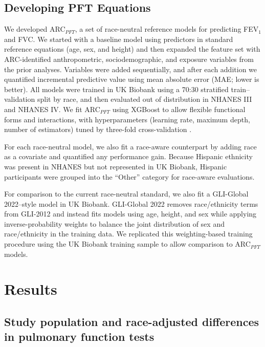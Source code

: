 \documentclass[10pt]{extarticle}
\begin{document}
\subsection{Developing PFT Equations }\label{developing-pft-equations}

We developed ARC$_{PFT}$, a set of race-neutral reference models for predicting FEV$_{1}$ and FVC. We started with a baseline model using predictors in standard reference equations (age, sex, and height) and then expanded the feature set with ARC-identified anthropometric, sociodemographic, and exposure variables from the prior analyses. Variables were added sequentially, and after each addition we quantified incremental predictive value using mean absolute error (MAE; lower is better). All models were trained in UK Biobank using a 70:30 stratified train--validation split by race, and then evaluated out of distribution in NHANES III and NHANES IV. We fit ARC$_{PFT}$ using XGBoost to allow flexible functional forms and interactions, with hyperparameters (learning rate, maximum depth, number of estimators) tuned by three-fold cross-validation \cite{Chen2016-st}.

For each race-neutral model, we also fit a race-aware counterpart by adding race as a covariate and quantified any performance gain. Because Hispanic ethnicity was present in NHANES but not represented in UK Biobank, Hispanic participants were grouped into the ``Other'' category for race-aware evaluations.

For comparison to the current race-neutral standard, we also fit a GLI-Global 2022--style model in UK Biobank. GLI-Global 2022 removes race/ethnicity terms from GLI-2012 and instead fits models using age, height, and sex while applying inverse-probability weights to balance the joint distribution of sex and race/ethnicity in the training data\cite{Moffett2023-eq,Bowerman2023-ff}. We replicated this weighting-based training procedure using the UK Biobank training sample to allow comparison to ARC$_{PFT}$ models.

\section{Results}\label{ARC_NatureHealth_v2:results}

\subsection{Study population and race-adjusted differences in pulmonary function tests}\label{ARC_NatureHealth_v2:study-population-and-race-adjusted-differences-in-pulmonary-function-tests}
\end{document}
